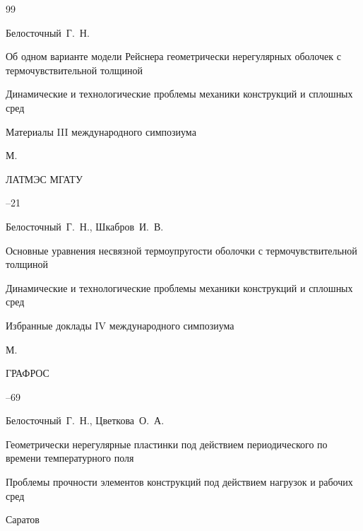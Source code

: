 




%




\begin{thebibliography}{99}




\by Белосточный~Г.~Н.

\paper Об одном варианте модели Рейснера геометрически нерегулярных оболочек с термочувствительной толщиной

\inbook Динамические и технологические проблемы механики конструкций и сплошных сред

\bookinfo Материалы III международного симпозиума

\publaddr М.

\publ ЛАТМЭС МГАТУ


--21




\by Белосточный~Г.~Н., Шкабров~И.~В.

\paper Основные уравнения несвязной термоупругости оболочки с термочувствительной толщиной

\inbook Динамические и технологические проблемы механики конструкций и сплошных сред

\bookinfo Избранные доклады IV международного симпозиума

\publaddr М.

\publ ГРАФРОС


--69






\by Белосточный~Г.~Н., Цветкова~О.~А.

\paper Геометрически нерегулярные пластинки под действием периодического по времени температурного поля

\inbook Проблемы прочности элементов конструкций под действием нагрузок и рабочих сред

\publaddr Саратов


\end{thebibliography}
